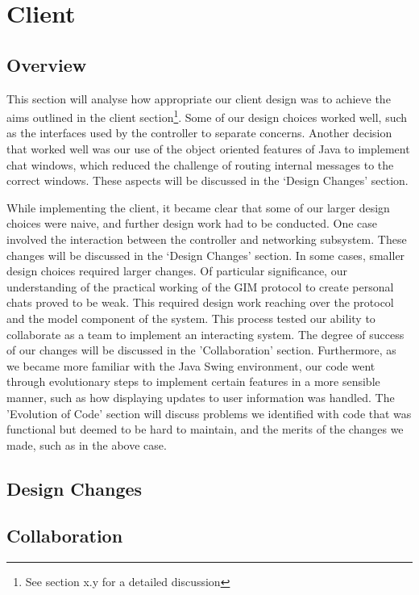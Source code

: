\section{Client}

\subsection{Overview}

This section will analyse how appropriate our client design was to achieve the aims outlined in the client section\footnote{See section x.y for a detailed discussion}. Some of our design choices worked well, such as the interfaces used by the controller to separate concerns. Another decision that worked well was our use of the object oriented features of Java to implement chat windows, which reduced the challenge of routing internal messages to the correct windows. These aspects will be discussed in the `Design Changes' section.

While implementing the client, it became clear that some of our larger design choices were naive, and further design work had to be conducted. One case involved the interaction between the controller and networking subsystem. These changes will be discussed in the `Design Changes' section. In some cases, smaller design choices required larger changes. Of particular significance, our understanding of the practical working of the GIM protocol to create personal chats proved to be weak. This required design work reaching over the protocol and the model component of the system. This process tested our ability to collaborate as a team to implement an interacting system. The degree of success of our changes will be discussed in the 'Collaboration' section. Furthermore, as we became more familiar with the Java Swing environment, our code went through evolutionary steps to implement certain features in a more sensible manner, such as how displaying updates to user information was handled. The 'Evolution of Code' section will discuss problems we identified with code that was functional but deemed to be hard to maintain, and the merits of the changes we made, such as in the above case. 

\subsection{Design Changes}



\subsection{Collaboration}

